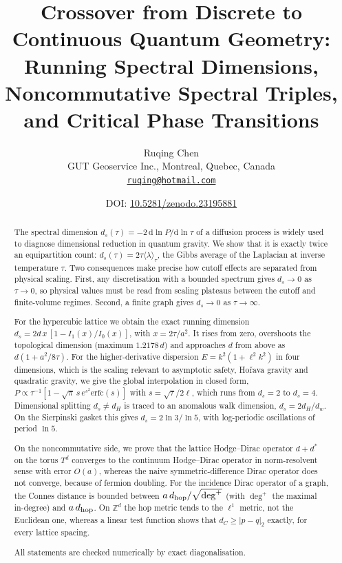 \documentclass[11pt]{article}
\title{Crossover from Discrete to Continuous Quantum Geometry:\\
Running Spectral Dimensions, Noncommutative Spectral Triples,\\ and Critical Phase Transitions}
\author{Ruqing Chen\\[2pt]
\small GUT Geoservice Inc., Montreal, Quebec, Canada\\
\small \href{mailto:ruqing@hotmail.com}{\texttt{ruqing@hotmail.com}}}
\date{\small DOI: \href{https://doi.org/10.5281/zenodo.23195881}{10.5281/zenodo.23195881}}
\theoremstyle{remark}\newtheorem*{remark}{Remark}
\newcommand{\dd}{\mathrm{d}}
\newcommand{\ZZ}{\mathbb{Z}}
\begin{document}
\maketitle

\begin{abstract}
The spectral dimension $d_s(\tau)=-2\,\dd\ln P/\dd\ln\tau$ of a diffusion process is widely used to diagnose
dimensional reduction in quantum gravity. We show that it is exactly twice an equipartition count:
$d_s(\tau)=2\tau\langle\lambda\rangle_\tau$, the Gibbs average of the Laplacian at inverse temperature $\tau$. Two consequences make precise how cutoff effects are separated from physical scaling. First, any
discretisation with a bounded spectrum gives $d_s\to0$ as $\tau\to0$, so physical values must be read from
scaling plateaus between the cutoff and finite-volume regimes. Second, a finite graph gives $d_s\to0$ as
$\tau\to\infty$.

For the hypercubic lattice we obtain the exact running dimension
$d_s=2d\,x\,[1-I_1(x)/I_0(x)]$, with $x=2\tau/a^2$. It rises from zero, overshoots the topological dimension
(maximum $1.2178\,d$) and approaches $d$ from above as $d(1+a^2/8\tau)$. For the higher-derivative dispersion
$E=k^2(1+\ell^2k^2)$ in four dimensions, which is the scaling relevant to asymptotic safety, Ho\v{r}ava gravity
and quadratic gravity, we give the global interpolation in closed form,
$P\propto\tau^{-1}[1-\sqrt\pi\,s\,e^{s^2}\mathrm{erfc}(s)]$ with $s=\sqrt\tau/2\ell$, which runs from $d_s=2$ to $d_s=4$.
Dimensional splitting $d_s\ne d_H$ is traced to an anomalous walk dimension, $d_s=2d_H/d_w$. On the Sierpinski
gasket this gives $d_s=2\ln3/\ln5$, with log-periodic oscillations of period $\ln5$.

On the noncommutative side, we prove that the lattice Hodge--Dirac operator $d+d^*$ on the torus $T^d$
converges to the continuum Hodge--Dirac operator in norm-resolvent sense with error $O(a)$, whereas the naive
symmetric-difference Dirac operator does not converge, because of fermion doubling. For the incidence Dirac
operator of a graph, the Connes distance is bounded between $a\,d_{\rm hop}/\sqrt{\deg^+}$ (with $\deg^+$ the maximal in-degree) and $a\,d_{\rm hop}$. On
$\ZZ^d$ the hop metric tends to the $\ell^1$ metric, not the Euclidean one, whereas a linear test function
shows that $d_C\ge|p-q|_2$ exactly, for every lattice spacing.

All statements are checked numerically by exact diagonalisation.
\end{abstract}
\end{document}

